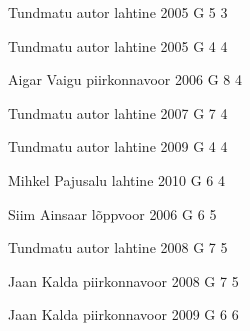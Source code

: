 \documentclass[11pt]{article}
\begin{document}
{Tundmatu autor} %
{lahtine} %
{2005} %
{G 5} %
{3} %
{

\ifEngHint
\fi
}

{Tundmatu autor} %
{lahtine} %
{2005} %
{G 4} %
{4} %
{

\ifEngHint
\fi
}

{Aigar Vaigu} %
{piirkonnavoor} %
{2006} %
{G 8} %
{4} %
{

\ifEngHint
\fi
}

{Tundmatu autor} %
{lahtine} %
{2007} %
{G 7} %
{4} %
{

\ifEngHint
\fi
}

{Tundmatu autor} %
{lahtine} %
{2009} %
{G 4} %
{4} %
{

\ifEngHint
\fi
}

{Mihkel Pajusalu} %
{lahtine} %
{2010} %
{G 6} %
{4} %
{

\ifEngHint
\fi
}

{Siim Ainsaar} %
{lõppvoor} %
{2006} %
{G 6} %
{5} %
{

\ifEngHint
\fi
}

{Tundmatu autor} %
{lahtine} %
{2008} %
{G 7} %
{5} %
{

\ifEngHint
\fi
}

{Jaan Kalda} %
{piirkonnavoor} %
{2008} %
{G 7} %
{5} %
{

\ifEngHint
\fi
}

{Jaan Kalda} %
{piirkonnavoor} %
{2009} %
{G 6} %
{6} %
{

\ifEngHint
\fi
}
\end{document}
